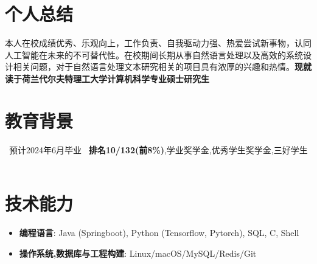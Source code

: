 \documentclass{resume}
\begin{document}


 
\section{个人总结}
本人在校成绩优秀、乐观向上，工作负责、自我驱动力强、热爱尝试新事物，认同人工智能在未来的不可替代性。在校期间长期从事自然语言处理以及高效的系统设计相关问题，对于自然语言处理文本研究相关的项目具有浓厚的兴趣和热情。\textbf{现就读于荷兰代尔夫特理工大学计算机科学专业硕士研究生}

\section{教育背景}
\ 预计2024年6月毕业
\ \textbf{排名10/132(前8\%)},学业奖学金,优秀学生奖学金,三好学生
\ 

\section{技术能力}
\begin{itemize}[parsep=0.2ex]
  \item \textbf{编程语言}: Java (Springboot), Python (Tensorflow, Pytorch), SQL, C, Shell
  \item \textbf{操作系统,数据库与工程构建}: Linux/macOS/MySQL/Redis/Git
\end{itemize}

\end{document}
